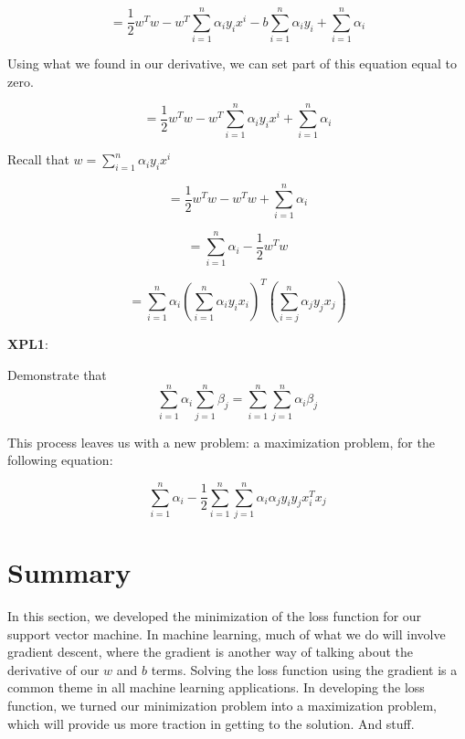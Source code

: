 \[ = \frac{1}{2}w^Tw - w^T \sum_{i=1}^{n} \alpha_i y_i x^i -  b \sum_{i=1}^{n} \alpha_i y_i + \sum_{i=1}^{n} \alpha_i  \]

Using what we found in our derivative, we can set part of this equation equal to zero.

\[ = \frac{1}{2}w^Tw - w^T \sum_{i=1}^{n} \alpha_i y_i x^i + \sum_{i=1}^{n} \alpha_i \]

Recall that \(w = \sum_{i=1}^{n} \alpha_i y_i x^i\)

\[ = \frac{1}{2}w^Tw - w^Tw + \sum_{i=1}^{n} \alpha_i \]

\[ = \sum_{i=1}^{n} \alpha_i  - \frac{1}{2}w^Tw \]

\[ = \sum_{i=1}^{n} \alpha_i ( \sum_{i=1}^{n} \alpha_i y_i x_i )^T ( \sum_{i=j}^{n} \alpha_j y_j x_j ) \]

\begin{tcolorbox}
\textbf{XPL1}:

Demonstrate that 
\[ \sum_{i=1}^n \alpha_i \sum_{j=1}^n \beta_j = \sum_{i=1}^n \sum_{j=1}^n \alpha_i\beta_j  \]

\end{tcolorbox}

This process leaves us with a new problem: a maximization problem, for the following equation: 

\[\sum_{i=1}^n \alpha_i - \frac{1}{2} \sum_{i=1}^n \sum_{j=1}^n \alpha_i \alpha_j y_i y_j x_i^Tx_j\]

\section{Summary}
In this section, we developed the minimization of the loss function for our support vector machine. In machine learning, much of what we do will involve gradient descent, where the gradient is another way of talking about the derivative of our \(w\) and \(b\) terms. Solving the loss function using the gradient is a common theme in all machine learning applications. In developing the loss function, we turned our minimization problem into a maximization problem, which will provide us more traction in getting to the solution. And stuff.